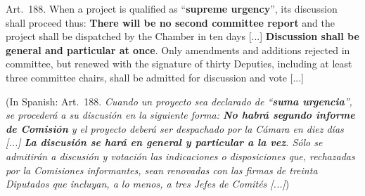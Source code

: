\documentclass[letter,12pt]{article}
\begin{document}

\singlespacing

Art.~188. When a project is qualified as ``\textbf{supreme urgency}'', its discussion shall proceed thus: \textbf{There will be no second committee report} and the project shall be dispatched by the Chamber in ten days [...] \textbf{Discussion shall be general and particular at once}. Only amendments and additions rejected in committee, but renewed with the signature of thirty Deputies, including at least three committee chairs, shall be admitted for discussion and vote [...]

(In Spanish: Art.~188. \emph{Cuando un proyecto sea declarado de ``\textbf{suma urgencia}'', se procederá a su discusión en la siguiente forma: \textbf{No habrá segundo informe de Comisión} y el proyecto deberá ser despachado por la Cámara en diez días [...]
\textbf{La discusión se hará en general y particular a la vez}. Sólo se admitirán a discusión y votación las indicaciones o disposiciones que, rechazadas por la Comisiones informantes, sean renovadas con las firmas de treinta Diputados que incluyan, a lo menos, a tres Jefes de Comités [...]})
\end{document}

